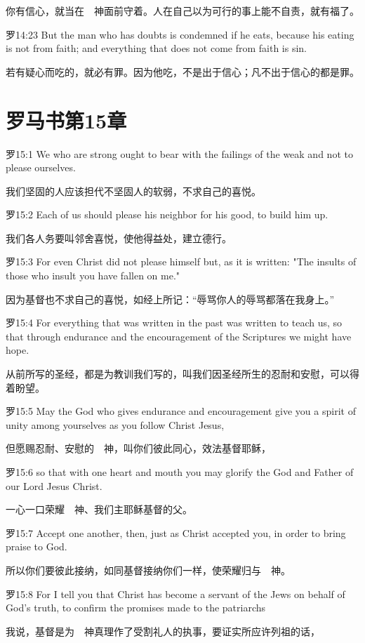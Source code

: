 \documentclass[a4paper,11pt,onecolumn,twoside]{ctexart}
\begin{document}
\begin{multicols}{2}
 你有信心，就当在　神面前守着。人在自己以为可行的事上能不自责，就有福了。


 罗14:23
 But the man who has doubts is condemned if he eats, because his eating is not from faith; and everything that does not come from faith is sin.

 若有疑心而吃的，就必有罪。因为他吃，不是出于信心；凡不出于信心的都是罪。


\section{ 罗马书第15章}
 罗15:1
 We who are strong ought to bear with the failings of the weak and not to please ourselves.

 我们坚固的人应该担代不坚固人的软弱，不求自己的喜悦。


 罗15:2
 Each of us should please his neighbor for his good, to build him up.

 我们各人务要叫邻舍喜悦，使他得益处，建立德行。


 罗15:3
 For even Christ did not please himself but, as it is written: "The insults of those who insult you have fallen on me."

 因为基督也不求自己的喜悦，如经上所记：“辱骂你人的辱骂都落在我身上。”


 罗15:4
 For everything that was written in the past was written to teach us, so that through endurance and the encouragement of the Scriptures we might have hope.

 从前所写的圣经，都是为教训我们写的，叫我们因圣经所生的忍耐和安慰，可以得着盼望。


 罗15:5
 May the God who gives endurance and encouragement give you a spirit of unity among yourselves as you follow Christ Jesus,

 但愿赐忍耐、安慰的　神，叫你们彼此同心，效法基督耶稣，


 罗15:6
 so that with one heart and mouth you may glorify the God and Father of our Lord Jesus Christ.

 一心一口荣耀　神、我们主耶稣基督的父。


 罗15:7
 Accept one another, then, just as Christ accepted you, in order to bring praise to God.

 所以你们要彼此接纳，如同基督接纳你们一样，使荣耀归与　神。


 罗15:8
 For I tell you that Christ has become a servant of the Jews on behalf of God's truth, to confirm the promises made to the patriarchs

 我说，基督是为　神真理作了受割礼人的执事，要证实所应许列祖的话，



\end{multicols}
\end{document}
